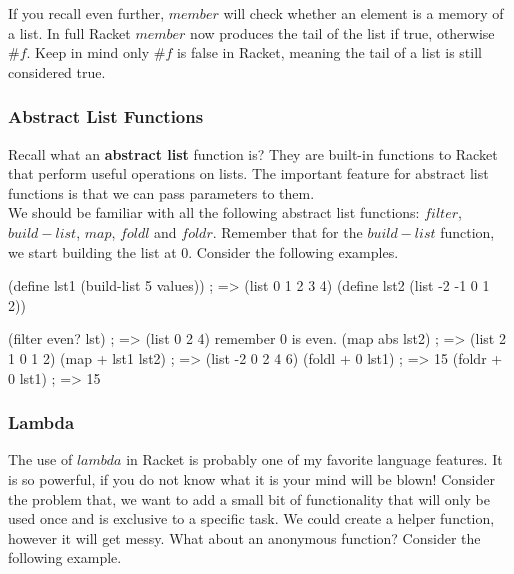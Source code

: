 If you recall even further, $member$ will check whether an element is a memory of a list. In full Racket $member$ now produces the tail of the list if true, otherwise $\#f$. Keep in mind only $\#f$ is false in Racket, meaning the tail of a list is still considered true.

\subsubsection*{Abstract List Functions}

Recall what an \textbf{abstract list} function is? They are built-in functions to Racket that perform useful operations on lists. The important feature for abstract list functions is that we can pass parameters to them.\\

We should be familiar with all the following abstract list functions: $filter$, $build-list$, $map$, $foldl$ and $foldr$. Remember that for the $build-list$ function, we start building the list at 0.  Consider the following examples.\\


\begin{code}[Lisp]
(define lst1 (build-list 5 values)) ; => (list 0 1 2 3 4)
(define lst2 (list -2 -1 0 1 2))

(filter even? lst) ; => (list 0 2 4) remember 0 is even.
(map abs lst2) ; => (list 2 1 0 1 2)
(map + lst1 lst2) ; => (list -2 0 2 4 6)
(foldl + 0 lst1) ; => 15
(foldr + 0 lst1) ; => 15
\end{code}

\subsubsection*{Lambda}

The use of $lambda$ in Racket is probably one of my favorite language features. It is so powerful, if you do not know what it is your mind will be blown! Consider the problem that, we want to add a small bit of functionality that will only be used once and is exclusive to a specific task. We could create a helper function, however it will get messy. What about an anonymous function? Consider the following example.\\


